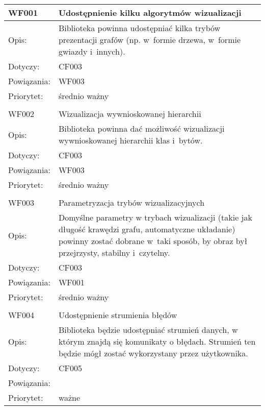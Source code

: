 \begin{center}

\begin{longtable}{|m{3cm}|m{9cm}|} \hline

WF001 & Udostępnienie kilku algorytmów wizualizacji \\ \hline
Opis: & Biblioteka powinna udostępniać kilka trybów prezentacji grafów (np. w~formie drzewa, w~formie gwiazdy i~innych).    \\ \hline
Dotyczy: & CF003 \\ \hline
Powiązania: &WF003 \\ \hline
Priorytet: & średnio ważny\\ \hline

\multicolumn{2}{c}{} \\
 \hline

WF002 & Wizualizacja wywnioskowanej hierarchii \\ \hline
Opis: & Biblioteka powinna dać możliwość wizualizacji wywnioskowanej hierarchii klas i~bytów. \\ \hline
Dotyczy: & CF003 \\ \hline
Powiązania: &WF003 \\ \hline
Priorytet: & średnio ważny\\ \hline

\multicolumn{2}{c}{} \\
 \hline

WF003 & Parametryzacja trybów wizualizacyjnych \\ \hline
Opis: & Domyślne parametry w trybach wizualizacji (takie jak długość krawędzi grafu, automatyczne układanie) powinny zostać dobrane w~taki sposób,
 by obraz był przejrzysty, stabilny i~czytelny.    \\ \hline
Dotyczy: & CF003 \\ \hline
Powiązania: & WF001 \\ \hline
Priorytet: & średnio ważny \\ \hline

\multicolumn{2}{c}{} \\
 \hline

WF004 & Udostępnienie strumienia błędów \\ \hline
Opis: &   Biblioteka będzie udostępniać strumień danych, w którym znajdą się komunikaty o błędach. Strumień ten będzie mógł zostać wykorzystany
 przez użytkownika. \\ \hline
Dotyczy: &  CF005  \\ \hline
Powiązania: & \\ \hline
Priorytet: & ważne \\ \hline
\end{longtable}

\end{center}

